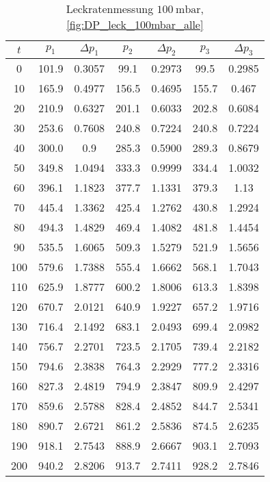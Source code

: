 \begin{table}[H]
    \centering
    \caption{Leckratenmessung $\SI{100}{\milli\bar}$, \ref{fig:DP_leck_100mbar_alle}}
    \label{tab:DP_leck_100mbar_alle}
    \begin{tabular}{c c c c c c c}
        \toprule
        {$t$} & {$p_1$} & {$\Delta p_1$} & {$p_2$} & {$\Delta p_2$} & {$p_3$} & {$\Delta p_3$} \\
        \midrule
        0 & 101.9 & 0.3057 & 99.1 & 0.2973 & 99.5 & 0.2985 \\
        10 & 165.9 & 0.4977 & 156.5 & 0.4695 & 155.7 & 0.467  \\
        20 & 210.9 & 0.6327 & 201.1 & 0.6033 & 202.8 & 0.6084  \\
        30 & 253.6 & 0.7608 & 240.8 & 0.7224 & 240.8 & 0.7224  \\
        40 & 300.0 & 0.9 & 285.3 & 0.5900 & 289.3 & 0.8679  \\
        50 & 349.8 & 1.0494 & 333.3 & 0.9999 & 334.4 & 1.0032  \\
        60 & 396.1 & 1.1823 & 377.7 & 1.1331 & 379.3 & 1.13  \\
        70 & 445.4 & 1.3362 & 425.4 & 1.2762 & 430.8 & 1.2924  \\
        80 & 494.3 & 1.4829 & 469.4 & 1.4082 & 481.8 & 1.4454  \\
        90 & 535.5 & 1.6065 & 509.3 & 1.5279 & 521.9 & 1.5656  \\
        100 & 579.6 & 1.7388 & 555.4 & 1.6662 & 568.1 & 1.7043 \\
        110 & 625.9 & 1.8777 & 600.2 & 1.8006 & 613.3 & 1.8398 \\
        120 & 670.7 & 2.0121 & 640.9 & 1.9227 & 657.2 & 1.9716 \\
        130 & 716.4 & 2.1492 & 683.1 & 2.0493 & 699.4 & 2.0982 \\
        140 & 756.7 & 2.2701 & 723.5 & 2.1705 & 739.4 & 2.2182 \\
        150 & 794.6 & 2.3838 & 764.3 & 2.2929 & 777.2 & 2.3316 \\
        160 & 827.3 & 2.4819 & 794.9 & 2.3847 & 809.9 & 2.4297 \\
        170 & 859.6 & 2.5788 & 828.4 & 2.4852 & 844.7 & 2.5341 \\
        180 & 890.7 & 2.6721 & 861.2 & 2.5836 & 874.5 & 2.6235 \\
        190 & 918.1 & 2.7543 & 888.9 & 2.6667 & 903.1 & 2.7093 \\
        200 & 940.2 & 2.8206 & 913.7 & 2.7411 & 928.2 & 2.7846 \\
        \bottomrule
    \end{tabular}
\end{table}

